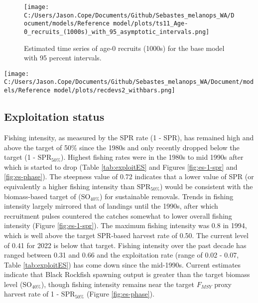 \documentclass[11pt,
  english,
  letterpaper,
]{article}
\begin{document}
\begin{figure}
\centering
\texttt{[image: C:/Users/Jason.Cope/Documents/Github/Sebastes\_melanops\_WA/Document/models/Reference model/plots/ts11\_Age-0\_recruits\_(1000s)\_with\_95\_asymptotic\_intervals.png]}
\caption{Estimated time series of age-0 recruits (1000s) for the base model with 95 percent intervals.\label{fig:es-recruits}}
\end{figure}

\texttt{[image: C:/Users/Jason.Cope/Documents/Github/Sebastes\_melanops\_WA/Document/models/Reference model/plots/recdevs2\_withbars.png]} \clearpage

\hypertarget{exploitation-status}{%
\subsection*{Exploitation status}\label{exploitation-status}}

Fishing intensity, as measured by the SPR rate (1 - SPR), has remained high and above the target of 50\% since the 1980s and only recently dropped below the target (1 - \(\text{SPR}_{50\%}\)). Highest fishing rates were in the 1980s to mid 1990s after which is started to drop (Table \ref{tab:exploitES} and Figures \ref{fig:es-1-spr} and \ref{fig:es-phase}). The steepness value of 0.72 indicates that a lower value of SPR (or equivalently a higher fishing intensity than \(\text{SPR}_{50\%}\)) would be consistent with the biomass-based target of (\(\text{SO}_{40\%}\)) for sustainable removals. Trends in fishing intensity largely mirrored that of landings until the 1990s, after which recruitment pulses countered the catches somewhat to lower overall fishing intensity (Figure \ref{fig:es-1-spr}). The maximum fishing intensity was 0.8 in 1994, which is well above the target SPR-based harvest rate of 0.50. The current level of 0.41 for 2022 is below that target. Fishing intensity over the past decade has ranged between 0.31 and 0.66 and the exploitation rate (range of 0.02 - 0.07, Table \ref{tab:exploitES}) has come down since the mid-1990s. Current estimates indicate that Black Rockfish spawning output is greater than the target biomass level (\(\text{SO}_{40\%}\)), though fishing intensity remains near the target \(F_{MSY}\) proxy harvest rate of 1 - \(\text{SPR}_{50\%}\) (Figure \ref{fig:es-phase}).


\end{document}
